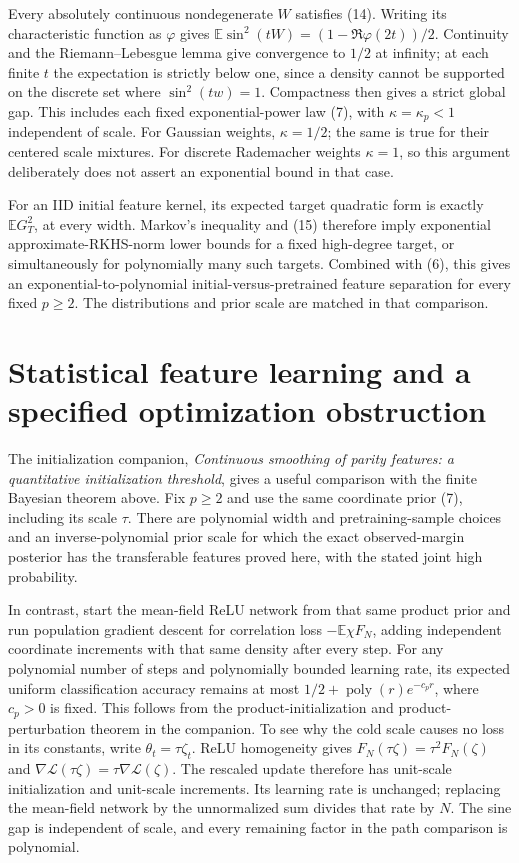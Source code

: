 \documentclass[11pt]{article}
\newcommand{\E}{\mathbb E}\newcommand{\R}{\mathbb R}
\begin{document}
Every absolutely continuous nondegenerate $W$ satisfies (14).
Writing its characteristic function as $\varphi$ gives
$\E\sin^2(tW)=(1-\Re\varphi(2t))/2$.
Continuity and the Riemann--Lebesgue lemma give convergence to $1/2$
at infinity; at each finite $t$ the expectation is strictly below one,
since a density cannot be supported on the discrete set where
$\sin^2(tw)=1$. Compactness then gives a strict global gap.
This includes each fixed exponential-power law (7), with
$\kappa=\kappa_p<1$ independent of scale. For Gaussian weights,
$\kappa=1/2$; the same is true for their centered scale mixtures.
For discrete Rademacher weights $\kappa=1$, so this argument deliberately
does not assert an exponential bound in that case.

For an IID initial feature kernel, its expected target quadratic form
is exactly $\E G_T^2$, at every width. Markov's inequality and (15)
therefore imply exponential approximate-RKHS-norm lower bounds for a
fixed high-degree target, or simultaneously for polynomially many such
targets. Combined with (6), this gives an exponential-to-polynomial
initial-versus-pretrained feature separation for every fixed $p\ge2$.
The distributions and prior scale are matched in that comparison.

\section{Statistical feature learning and a specified optimization obstruction}
The initialization companion, \emph{Continuous smoothing of parity
features: a quantitative initialization threshold}, gives a useful
comparison with the finite Bayesian theorem above. Fix $p\ge2$ and
use the same coordinate prior (7), including its scale $\tau$.
There are polynomial width and pretraining-sample choices and an
inverse-polynomial prior scale for which the exact observed-margin
posterior has the transferable features proved here, with the stated
joint high probability.

In contrast, start the mean-field ReLU network from that same product
prior and run population gradient descent for correlation loss
$-\E\chi F_N$, adding independent coordinate increments with that
same density after every step. For any polynomial number of steps and
polynomially bounded learning rate, its expected uniform classification
accuracy remains at most $1/2+\operatorname{poly}(r)e^{-c_pr}$,
where $c_p>0$ is fixed.
This follows from the product-initialization and product-perturbation
theorem in the companion. To see why the cold scale causes no loss in
its constants, write $\theta_t=\tau\zeta_t$. ReLU homogeneity gives
$F_N(\tau\zeta)=\tau^2F_N(\zeta)$ and
$\nabla\mathcal L(\tau\zeta)=\tau\nabla\mathcal L(\zeta)$.
The rescaled update therefore has unit-scale initialization and
unit-scale increments. Its learning rate is unchanged; replacing the
mean-field network by the unnormalized sum divides that rate by $N$.
The sine gap is independent of scale, and every remaining factor in
the path comparison is polynomial.
\end{document}
